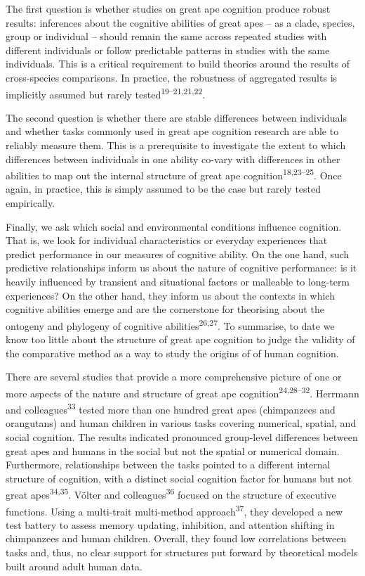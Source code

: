 \documentclass[
  man,floatsintext]{apa6}
\begin{document}
The first question is whether studies on great ape cognition produce robust results: inferences about the cognitive abilities of great apes -- as a clade, species, group or individual -- should remain the same across repeated studies with different individuals or follow predictable patterns in studies with the same individuals. This is a critical requirement to build theories around the results of cross-species comparisons. In practice, the robustness of aggregated results is implicitly assumed but rarely tested\textsuperscript{19--21,21,22}.

The second question is whether there are stable differences between individuals and whether tasks commonly used in great ape cognition research are able to reliably measure them. This is a prerequisite to investigate the extent to which differences between individuals in one ability co-vary with differences in other abilities to map out the internal structure of great ape cognition\textsuperscript{18,23--25}. Once again, in practice, this is simply assumed to be the case but rarely tested empirically.

Finally, we ask which social and environmental conditions influence cognition. That is, we look for individual characteristics or everyday experiences that predict performance in our measures of cognitive ability. On the one hand, such predictive relationships inform us about the nature of cognitive performance: is it heavily influenced by transient and situational factors or malleable to long-term experiences? On the other hand, they inform us about the contexts in which cognitive abilities emerge and are the cornerstone for theorising about the ontogeny and phylogeny of cognitive abilities\textsuperscript{26,27}. To summarise, to date we know too little about the structure of great ape cognition to judge the validity of the comparative method as a way to study the origins of of human cognition.

There are several studies that provide a more comprehensive picture of one or more aspects of the nature and structure of great ape cognition\textsuperscript{24,28--32}. Herrmann and colleagues\textsuperscript{33} tested more than one hundred great apes (chimpanzees and orangutans) and human children in various tasks covering numerical, spatial, and social cognition. The results indicated pronounced group-level differences between great apes and humans in the social but not the spatial or numerical domain. Furthermore, relationships between the tasks pointed to a different internal structure of cognition, with a distinct social cognition factor for humans but not great apes\textsuperscript{34,35}. Völter and colleagues\textsuperscript{36} focused on the structure of executive functions. Using a multi-trait multi-method approach\textsuperscript{37}, they developed a new test battery to assess memory updating, inhibition, and attention shifting in chimpanzees and human children. Overall, they found low correlations between tasks and, thus, no clear support for structures put forward by theoretical models built around adult human data.
\end{document}
